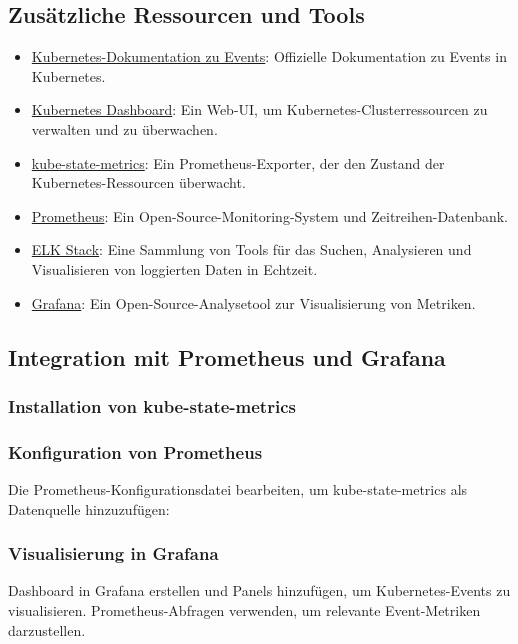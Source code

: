 \subsection{Zusätzliche Ressourcen und Tools}
\begin{itemize}
    \item \href{https://kubernetes.io/docs/reference/kubectl/generated/kubectl_events/}{Kubernetes-Dokumentation zu Events}: Offizielle Dokumentation zu Events in Kubernetes.
    \item \href{https://kubernetes.io/docs/tasks/access-application-cluster/web-ui-dashboard/}{Kubernetes Dashboard}: Ein Web-UI, um Kubernetes-Clusterressourcen zu verwalten und zu überwachen.
    \item \href{https://github.com/kubernetes/kube-state-metrics}{kube-state-metrics}: Ein Prometheus-Exporter, der den Zustand der Kubernetes-Ressourcen überwacht.
    \item \href{https://prometheus.io/}{Prometheus}: Ein Open-Source-Monitoring-System und Zeitreihen-Datenbank.
    \item \href{https://www.elastic.co/elk-stack}{ELK Stack}: Eine Sammlung von Tools für das Suchen, Analysieren und Visualisieren von loggierten Daten in Echtzeit.
    \item \href{https://grafana.com/}{Grafana}: Ein Open-Source-Analysetool zur Visualisierung von Metriken.
\end{itemize}
\newpage
\subsection{Integration mit Prometheus und Grafana}

\subsubsection{Installation von kube-state-metrics}

\subsubsection{Konfiguration von Prometheus}
Die Prometheus-Konfigurationsdatei bearbeiten, um kube-state-metrics als Datenquelle hinzuzufügen:


\subsubsection{Visualisierung in Grafana}
Dashboard in Grafana erstellen und Panels hinzufügen, um Kubernetes-Events zu visualisieren. Prometheus-Abfragen verwenden, um relevante Event-Metriken darzustellen.

